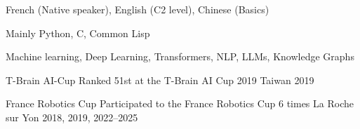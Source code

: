 \documentclass[11pt, a4paper]{awesome-cv}
\begin{document}

\begin{cvskills}
  {French (Native speaker), English (C2 level), Chinese (Basics)}
  
  {Mainly Python, C, Common Lisp}

  {Machine learning, Deep Learning, Transformers, NLP, LLMs, Knowledge Graphs}
\end{cvskills}



\begin{cvhonors}
  \cvhonor
  {T-Brain AI-Cup}
  {Ranked 51st at the T-Brain AI Cup 2019}
  {Taiwan}
  {2019}
  
  \cvhonor
  {France Robotics Cup}
  {Participated to the France Robotics Cup 6 times}
  {La Roche sur Yon}
  {2018, 2019, 2022--2025}
\end{cvhonors}


{}

\begin{refsection}
  \nocite{*}
  \printbibliography[heading=none]
\end{refsection}



\begin{refsection}
  \nocite{*}
  \printbibliography[heading=none]
\end{refsection}



\begin{refsection}
  \nocite{*}
  \printbibliography[heading=none]
\end{refsection}



\begin{refsection}
  \nocite{*}
  \printbibliography[heading=none]
\end{refsection}

\begin{refsection}
  \nocite{*}
  \printbibliography[heading=none]
\end{refsection}



\begin{refsection}
  \nocite{*}
  \printbibliography[heading=none]
\end{refsection}
\end{document}

